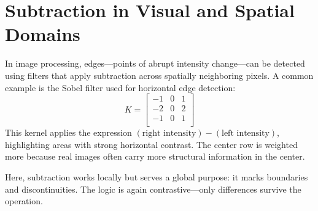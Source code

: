 \section{Subtraction in Visual and Spatial Domains}
In image processing, edges—points of abrupt intensity change—can be detected using filters that apply subtraction across spatially neighboring pixels. A common example is the Sobel filter used for horizontal edge detection:
\[
K = \begin{bmatrix}
	-1 & 0 & 1 \\
	-2 & 0 & 2 \\
	-1 & 0 & 1 \\
\end{bmatrix}
\]
This kernel applies the expression $(\text{right intensity}) - (\text{left intensity})$, highlighting areas with strong horizontal contrast. The center row is weighted more because real images often carry more structural information in the center.

Here, subtraction works locally but serves a global purpose: it marks boundaries and discontinuities. The logic is again contrastive—only differences survive the operation.